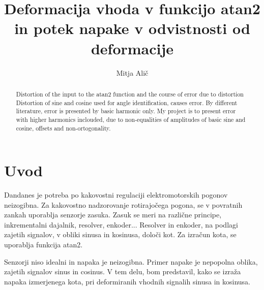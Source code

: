 \documentclass[a4paper]{article}
\begin{document}
\title{Deformacija vhoda v funkcijo atan2 in potek napake v odvistnosti od deformacije}

\author{Mitja Alič} %



\maketitle


\begin{abstract}{Distortion of the input to the atan2 function and the course of error due to distortion}
Distortion of sine and cosine used for angle identification, causes error. By different literature, error is presented by basic harmonic only. My project is to present error with higher harmonics inclouded, due to non-equalities of amplitudes of basic sine and cosine, offsets and non-ortogonality.
\end{abstract}



\section{Uvod}

Dandanes je potreba po kakovostni regulaciji elektromotorskih pogonov neizogibna. Za kakovostno nadzorovanje rotirajočega pogona, se v povratnih zankah uporablja senzorje zasuka. Zasuk se meri na različne principe, inkrementalni dajalnik, resolver, enkoder... Resolver in enkoder, na podlagi zajetih signalov, v obliki sinusa in kosinusa, določi kot. Za izračun kota, se uporablja funkcija atan2.

Senzorji niso idealni in napaka je neizogibna. Primer napake je nepopolna oblika, zajetih signalov sinus in cosinus. V tem delu, bom predstavil, kako se izraža napaka izmerjenega kota, pri deformiranih vhodnih signalih sinusa in kosinusa.
\end{document}
